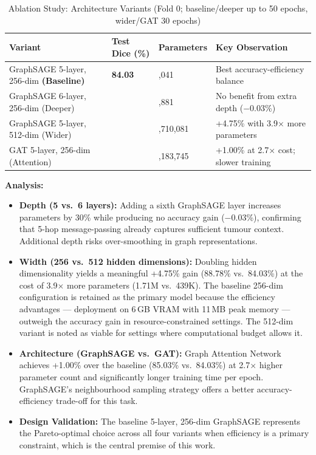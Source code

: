 \begin{table}[htbp]
\caption{Ablation Study: Architecture Variants (Fold 0; baseline/deeper up to 50 epochs, wider/GAT 30 epochs)}
\begin{center}
\begin{tabularx}{\textwidth} {
  | >{\raggedright\arraybackslash}X
  | >{\centering\arraybackslash}X
  | >{\centering\arraybackslash}X
  | >{\centering\arraybackslash}X
  | }
\hline
\textbf{Variant} & \textbf{Test Dice (\%)} & \textbf{Parameters} & \textbf{Key Observation}\\
\hline
GraphSAGE 5-layer, 256-dim \textbf{(Baseline)} & \textbf{84.03} & 439,041 & Best accuracy-efficiency balance\\
\hline
GraphSAGE 6-layer, 256-dim (Deeper) & 84.00 & 570,881 & No benefit from extra depth ($-$0.03\%)\\
\hline
GraphSAGE 5-layer, 512-dim (Wider) & 88.78 & 1,710,081 & +4.75\% with 3.9$\times$ more parameters\\
\hline
GAT 5-layer, 256-dim (Attention) & 85.03 & 1,183,745 & +1.00\% at 2.7$\times$ cost; slower training\\
\hline
\end{tabularx}
\label{tab:ablation}
\end{center}
\end{table}

\textbf{Analysis:}
\begin{itemize}
    \item \textbf{Depth (5 vs.\ 6 layers):} Adding a sixth GraphSAGE layer increases parameters by 30\% while producing no accuracy gain ($-$0.03\%), confirming that 5-hop message-passing already captures sufficient tumour context. Additional depth risks over-smoothing in graph representations.

    \item \textbf{Width (256 vs.\ 512 hidden dimensions):} Doubling hidden dimensionality yields a meaningful +4.75\% gain (88.78\% vs.\ 84.03\%) at the cost of 3.9$\times$ more parameters (1.71M vs.\ 439K). The baseline 256-dim configuration is retained as the primary model because the efficiency advantages — deployment on 6\,GB VRAM with 11\,MB peak memory — outweigh the accuracy gain in resource-constrained settings. The 512-dim variant is noted as viable for settings where computational budget allows it.

    \item \textbf{Architecture (GraphSAGE vs.\ GAT):} Graph Attention Network achieves +1.00\% over the baseline (85.03\% vs.\ 84.03\%) at 2.7$\times$ higher parameter count and significantly longer training time per epoch. GraphSAGE's neighbourhood sampling strategy offers a better accuracy-efficiency trade-off for this task.

    \item \textbf{Design Validation:} The baseline 5-layer, 256-dim GraphSAGE represents the Pareto-optimal choice across all four variants when efficiency is a primary constraint, which is the central premise of this work.
\end{itemize}


